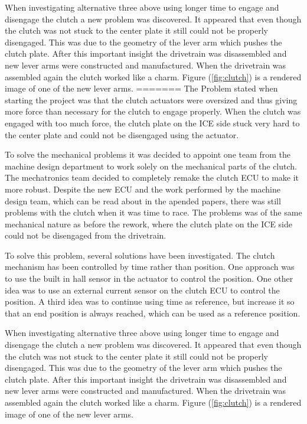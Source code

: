 When investigating alternative three above using longer time to engage and
disengage the clutch a new problem was discovered. It appeared that even though
the clutch was not stuck to the center plate it still could not be properly
disengaged. This was due to the geometry of the lever arm which pushes the
clutch plate.  After this important insight the drivetrain was disassembled and
new lever arms were constructed and manufactured. When the drivetrain was
assembled again the clutch worked like a charm. Figure (\ref{fig:clutch}) is a
rendered image of one of the new lever arms.
=======
The Problem stated when starting the project was that the clutch actuators were oversized and thus giving more force than necessary for the clutch to engage properly. When the clutch was engaged with too much force, the clutch plate on the ICE side stuck very hard to the center plate and could not be disengaged using the actuator.

To solve the mechanical problems it was decided to appoint one team from the machine design department to work solely on the mechanical parts of the clutch. The mechatronics team decided to completely remake the clutch ECU to make it more robust. Despite the new ECU and the work performed by the machine design team, which can be read about in the apended papers, there was still problems with the clutch when it was time to race. The problems was of the same mechanical nature as before the rework, where the clutch plate on the ICE side could not be disengaged from the drivetrain.

To solve this problem, several solutions have been investigated. The clutch mechanism has been controlled by time rather than position. One approach was to use the built in hall sensor in the actuator to control the position. One other idea was to use an external current sensor on the clutch ECU to control the position. A third idea was to continue using time as reference, but increase it so that an end position is always reached, which can be used as a reference position.

When investigating alternative three above using longer time to engage and disengage the clutch a new problem was discovered. It appeared that even though the clutch was not stuck to the center plate it still could not be properly disengaged. This was due to the geometry of the lever arm which pushes the clutch plate.  After this important insight the drivetrain was disassembled and new lever arms were constructed and manufactured. When the drivetrain was assembled again the clutch worked like a charm. Figure (\ref{fig:clutch}) is a rendered image of one of the new lever arms.

